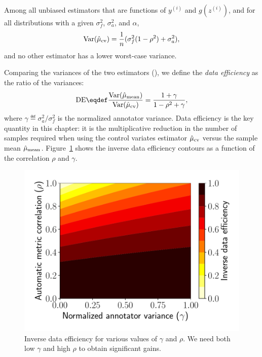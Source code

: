 \begin{theorem}
\label{thm:main}
Among all unbiased
  estimators that are functions of $y^{(i)}$ and $g(z^{(i)})$, and for all distributions with a given $\sigma^2_f$, $\sigma^2_a$, and $\alpha$,
\begin{align}
  \label{eqn:varcontrol}
  \operatorname{Var}(\hat \mu_\text{cv}) = \frac{1}{n} (\sigma^2_f (1 - \rho^2) + \sigma^2_a),
\end{align}
and no other estimator has a lower worst-case variance.
\end{theorem}

Comparing the variances of the two estimators (),
we define the \emph{data efficiency} as the ratio of the variances:
\begin{align}
\DE \eqdef \frac{\Var(\musimple)}{\Var(\mucontrol)} = \frac{1 + \gamma}{1-\rho^2 + \gamma},
\end{align}
where $\gamma \eqdef \sigma^2_a / \sigma^2_f$ is the normalized annotator variance.
Data efficiency is the key quantity in this chapter:
  it is the multiplicative reduction in the number of samples required
  when using the control variates estimator $\hat \mu_\text{cv}$ versus the sample mean $\hat \mu_\text{mean}$.
Figure~\ref{fig:savings} shows the inverse data efficiency contours as a function of the correlation $\rho$
and $\gamma$.

\begin{figure}
\centering
  \includegraphics[width=0.8\columnwidth]{figures/savings}
  \caption[Inverse data efficiency with the control variates estimator]  {\label{fig:savings} Inverse data efficiency for various values of
  $\gamma$ and $\rho$.  We need both low $\gamma$ and high $\rho$ to obtain
  significant gains.
  }
\end{figure}

